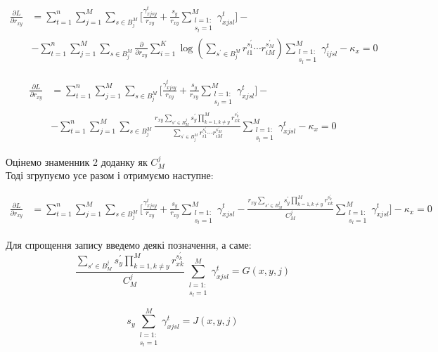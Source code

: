 \documentclass[14pt]{article}
\begin{document}
\begin{align*}
\frac{\partial L}{\partial r_{xy}} &= \sum_{t=1}^{n} \sum_{j=1}^{M} \sum_{s \in B^M_j} \Big[\frac{\gamma_{xjsy}^t }{r_{xy}} + 
\frac{s_y}{r_{xy}}\sum_{\substack{l=1:\\ s_l=1}}^{M} \gamma_{xjsl}^t \Big] - \\
& - \sum_{t=1}^{n} \sum_{j=1}^{M} \sum_{s \in B^M_j} \frac{\partial}{\partial r_{xy}} \sum_{i=1}^{K} \log{\left( \sum_{s^{'} \in B^M_j} r_{i1}^{s^{'}_1} \cdots r_{iM}^{s^{'}_M} \right)} \sum_{\substack{l=1:\\ s_l=1}}^{M} \gamma_{ijsl}^t - \kappa_x = 0
\end{align*}

\begin{align*}
\frac{\partial L}{\partial r_{xy}} &= \sum_{t=1}^{n} \sum_{j=1}^{M} \sum_{s \in B^M_j} \Big[\frac{\gamma_{xjsy}^t }{r_{xy}} + 
\frac{s_y}{r_{xy}}\sum_{\substack{l=1:\\ s_l=1}}^{M} \gamma_{xjsl}^t \Big] - \\
& - \sum_{t=1}^{n} \sum_{j=1}^{M} \sum_{s \in B^M_j} \frac{r_{xy} \sum_{s' \in B^j_M} s^{'}_y \prod_{k=1,  k \neq y}^{M} r_{xk}^{s^{'}_k}}{\sum_{s^{'} \in B^M_j} r_{i1}^{s^{'}_1} \cdots r_{iM}^{s^{'}_M}} \sum_{\substack{l=1:\\ s_l=1}}^{M} \gamma_{xjsl}^t - \kappa_x = 0
\end{align*}

Оцінемо знаменник 2 доданку як $C_M^j$ \\ 
Тоді згрупуємо усе разом і отримуємо наступне:


\pagebreak

\begin{align*}
\frac{\partial L}{\partial r_{xy}} &= \sum_{t=1}^{n} \sum_{j=1}^{M} \sum_{s \in B^M_j} \Big[\frac{\gamma_{xjsy}^t }{r_{xy}} + 
\frac{s_y}{r_{xy}}\sum_{\substack{l=1:\\ s_l=1}}^{M} \gamma_{xjsl}^t - \frac{r_{xy} \sum_{s' \in B^j_M} s^{'}_y \prod_{k=1,  k \neq y}^{M} r_{xk}^{s^{'}_k}}{C_M^j} \sum_{\substack{l=1:\\ s_l=1}}^{M} \gamma_{xjsl}^t \Big] - \kappa_x = 0
\end{align*}

Для спрощення запису введемо деякі позначення, а саме:
$$
\frac{\sum_{s' \in B^j_M} s^{'}_y \prod_{k=1,  k \neq y}^{M} r_{xk}^{s^{'}_k}}{C_M^j}  \sum_{\substack{l=1:\\ s_l=1}}^{M} \gamma_{xjsl}^t = G(x, y, j)
$$

$$
s_y \sum_{\substack{l=1:\\ s_l=1}}^{M} \gamma_{xjsl}^t = J(x, y, j)
$$
\end{document}
